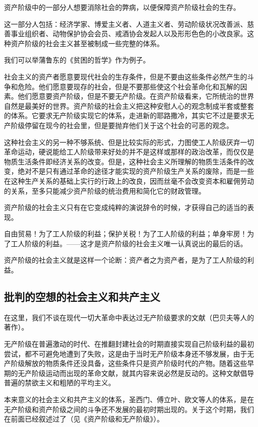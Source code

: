 \documentclass[10pt, UTF8]{book} %
\begin{document}
资产阶级中的一部分人想要消除社会的弊病，以便保障资产阶级社会的生存。

这一部分人包括：经济学家、博爱主义者、人道主义者、劳动阶级状况改善派、慈善事业组织者、动物保护协会会员、戒酒协会发起人以及形形色色的小改良家。这种资产阶级的社会主义甚至被制成一些完整的体系。

我们可以举蒲鲁东的《贫困的哲学》作为例子。

社会主义的资产者愿意要现代社会的生存条件，但是不要由这些条件必然产生的斗争和危险。他们愿意要现存的社会，但是不要那些使这个社会革命化和瓦解的因素。他们愿意要资产阶级，但是不要无产阶级。在资产阶级看来，它所统治的世界自然是最美好的世界。资产阶级的社会主义把这种安慰人心的观念制成半套或整套的体系。它要求无产阶级实现它的体系，走进新的耶路撒冷，其实它不过是要求无产阶级停留在现今的社会里，但是要抛弃他们关于这个社会的可恶的观念。

这种社会主义的另一种不够系统、但是比较实际的形式，力图使工人阶级厌弃一切革命运动，硬说能给工人阶级带来好处的并不是这样或那样的政治改革，而仅仅是物质生活条件即经济关系的改变。但是，这种社会主义所理解的物质生活条件的改变，绝对不是只有通过革命的途径才能实现的资产阶级生产关系的废除，而是一些在这种生产关系的基础上实行的行政上的改良，因而丝毫不会改变资本和雇佣劳动的关系，至多只能减少资产阶级的统治费用和简化它的财政管理。

资产阶级的社会主义只有在它变成纯粹的演说辞令的时候，才获得自己的适当的表现。

自由贸易！为了工人阶级的利益；保护关税！为了工人阶级的利益；单身牢房！为了工人阶级的利益。——这才是资产阶级的社会主义唯一认真说出的最后的话。

资产阶级的社会主义就是这样一个论断：资产者之为资产者，是为了工人阶级的利益。

\subsection{批判的空想的社会主义和共产主义}

在这里，我们不谈在现代一切大革命中表达过无产阶级要求的文献（巴贝夫等人的著作）。

无产阶级在普遍激动的时代、在推翻封建社会的时期直接实现自己阶级利益的最初尝试，都不可避免地遭到了失败，这是由于当时无产阶级本身还不够发展，由于无产阶级解放的物质条件还没具备，这些条件只是资产阶级时代的产物。随着这些早期的无产阶级运动而出现的革命文献，就其内容来说必然是反动的。这种文献倡导普遍的禁欲主义和粗陋的平均主义。

本来意义的社会主义和共产主义的体系，圣西门、傅立叶、欧文等人的体系，是在无产阶级和资产阶级之间的斗争还不发展的最初时期出现的。关于这个时期，我们在前面已经叙述过了（见《资产阶级和无产阶级》）。
\end{document}
